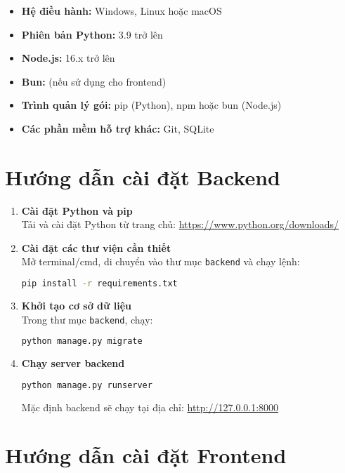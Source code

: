 \documentclass{book}
\let\oldsection\section
\renewcommand{\section}{\clearpage\oldsection}
\begin{document}
\begin{itemize}
    \item \textbf{Hệ điều hành:} Windows, Linux hoặc macOS
    \item \textbf{Phiên bản Python:} 3.9 trở lên
    \item \textbf{Node.js:} 16.x trở lên
    \item \textbf{Bun:} (nếu sử dụng cho frontend)
    \item \textbf{Trình quản lý gói:} pip (Python), npm hoặc bun (Node.js)
    \item \textbf{Các phần mềm hỗ trợ khác:} Git, SQLite
\end{itemize}

\section{Hướng dẫn cài đặt Backend}

\begin{enumerate}
    \item \textbf{Cài đặt Python và pip} \\
    Tải và cài đặt Python từ trang chủ: \url{https://www.python.org/downloads/}
    \item \textbf{Cài đặt các thư viện cần thiết} \\
    Mở terminal/cmd, di chuyển vào thư mục \texttt{backend} và chạy lệnh:
    \begin{lstlisting}[language=bash]
pip install -r requirements.txt
    \end{lstlisting}
    \item \textbf{Khởi tạo cơ sở dữ liệu} \\
    Trong thư mục \texttt{backend}, chạy:
    \begin{lstlisting}[language=bash]
python manage.py migrate
    \end{lstlisting}
    \item \textbf{Chạy server backend} \\
    \begin{lstlisting}[language=bash]
python manage.py runserver
    \end{lstlisting}
    Mặc định backend sẽ chạy tại địa chỉ: \url{http://127.0.0.1:8000}
\end{enumerate}

\section{Hướng dẫn cài đặt Frontend}
\end{document}
